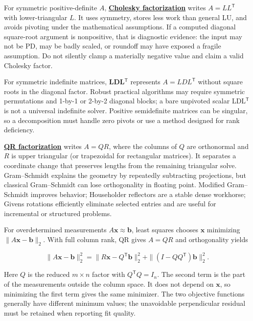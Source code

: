 For symmetric positive-definite \(A\), \textbf{\hyperref[01-foundations-i-ch020-positive-definiteness-is-a-structural-promise]{Cholesky factorization}} writes \(A=LL^\mathsf T\) with lower-triangular \(L\). It uses symmetry, stores less work than general LU, and avoids pivoting under the mathematical assumptions. If a computed diagonal square-root argument is nonpositive, that is diagnostic evidence: the input may not be PD, may be badly scaled, or roundoff may have exposed a fragile assumption. Do not silently clamp a materially negative value and claim a valid Cholesky factor.

For symmetric indefinite matrices, \textbf{LDL\(^\mathsf T\)} represents \(A=LDL^\mathsf T\) without square roots in the diagonal factor. Robust practical algorithms may require symmetric permutations and 1-by-1 or 2-by-2 diagonal blocks; a bare unpivoted scalar LDL\(^\mathsf T\) is not a universal indefinite solver. Positive semidefinite matrices can be singular, so a decomposition must handle zero pivots or use a method designed for rank deficiency.

\textbf{\hyperref[01-foundations-i-ch020-reflections-and-plane-rotations-build-qr-without-losing-lengths]{QR factorization}} writes \(A=QR\), where the columns of \(Q\) are orthonormal and \(R\) is upper triangular (or trapezoidal for rectangular matrices). It separates a coordinate change that preserves lengths from the remaining triangular solve. Gram--Schmidt explains the geometry by repeatedly subtracting projections, but classical Gram--Schmidt can lose orthogonality in floating point. Modified Gram--Schmidt improves behavior; Householder reflectors are a stable dense workhorse; Givens rotations efficiently eliminate selected entries and are useful for incremental or structured problems.

For overdetermined measurements \(A\mathbf x\approx\mathbf b\), least squares chooses \(\mathbf x\) minimizing \(\|A\mathbf x-\mathbf b\|_2\). With full column rank, QR gives \(A=QR\) and orthogonality yields

\[
\|A\mathbf x-\mathbf b\|_2^2
=\|R\mathbf x-Q^\mathsf T\mathbf b\|_2^2
+\|(I-QQ^\mathsf T)\mathbf b\|_2^2.
\]

Here \(Q\) is the reduced \(m\times n\) factor with \(Q^\mathsf TQ=I_n\). The second term is the part of the measurements outside the column space. It does not depend on \(\mathbf x\), so minimizing the first term gives the same minimizer. The two objective functions generally have different minimum values; the unavoidable perpendicular residual must be retained when reporting fit quality.

